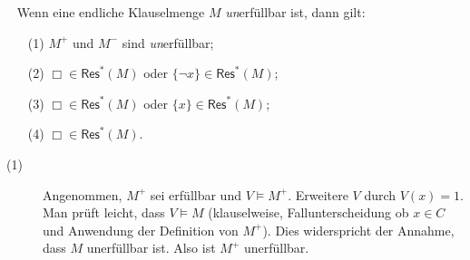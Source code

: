 \documentclass[fontsize=11pt, twoside=false, numbers=autoenddot]{scrbook}
\begin{document}
~
Wenn eine endliche Klauselmenge $M$ \emph{un}erfüllbar ist, dann gilt:
%
\begin{enumerate}
  \item[(1)]
    $M^+$ und $M^-$ sind \emph{un}erfüllbar;
  \item[(2)]
    $\Box \in \textsf{Res}^*(M)$ oder $\{\lnot x\} \in \textsf{Res}^*(M)$;
  \item[(3)]
    $\Box \in \textsf{Res}^*(M)$ oder $\{x\} \in \textsf{Res}^*(M)$;
  \item[(4)]
    $\Box \in \textsf{Res}^*(M)$.
\end{enumerate}

\par\noindent
\begin{beweis}
  \tikzset{baseline=5mm, grow=up, level distance=12mm, sibling distance=-18mm}
  \begin{description}
    \item[(1)]
      Angenommen, $M^+$ sei erfüllbar und $V \models M^+$.
      Erweitere $V$ durch $V(x) = 1$.
      Man prüft leicht, dass $V \models M$ (klauselweise, Fallunterscheidung ob 
      $x \in C$ und Anwendung der Definition von $M^+$).
      Dies widerspricht der Annahme, dass $M$ unerfüllbar ist.
      Also ist $M^+$ unerfüllbar.


\end{description}
\end{beweis}
\end{document}
